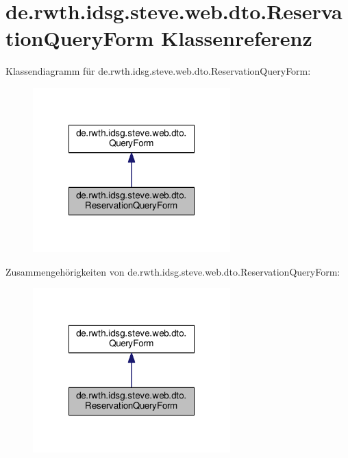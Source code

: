 \hypertarget{classde_1_1rwth_1_1idsg_1_1steve_1_1web_1_1dto_1_1_reservation_query_form}{\section{de.\-rwth.\-idsg.\-steve.\-web.\-dto.\-Reservation\-Query\-Form Klassenreferenz}
\label{classde_1_1rwth_1_1idsg_1_1steve_1_1web_1_1dto_1_1_reservation_query_form}
}


Klassendiagramm für de.\-rwth.\-idsg.\-steve.\-web.\-dto.\-Reservation\-Query\-Form\-:\nopagebreak
\begin{figure}[H]
\begin{center}
\leavevmode
\includegraphics[width=216pt]{classde_1_1rwth_1_1idsg_1_1steve_1_1web_1_1dto_1_1_reservation_query_form__inherit__graph}
\end{center}
\end{figure}


Zusammengehörigkeiten von de.\-rwth.\-idsg.\-steve.\-web.\-dto.\-Reservation\-Query\-Form\-:\nopagebreak
\begin{figure}[H]
\begin{center}
\leavevmode
\includegraphics[width=216pt]{classde_1_1rwth_1_1idsg_1_1steve_1_1web_1_1dto_1_1_reservation_query_form__coll__graph}
\end{center}
\end{figure}
